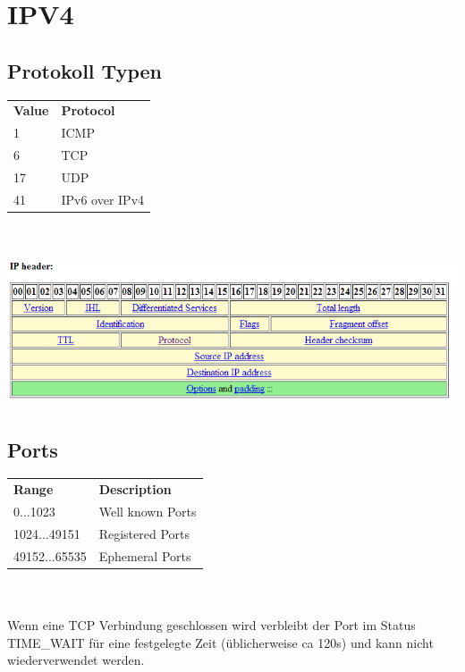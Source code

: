 \section{IPV4}
\subsection{Protokoll Typen}
\begin{tabular}[h]{ll}
  \textbf{Value} & \textbf{Protocol} \\
  1 & ICMP \\
  6 & TCP\\
  17 & UDP\\
  41 & IPv6 over IPv4
 \end{tabular}
 \\
 \\
\includegraphics[scale=0.8]{media/IPHeader.png}
\subsection{Ports}
\begin{tabular}[h]{ll}
  \textbf{Range} & \textbf{Description} \\
  0...1023 & Well known Ports \\
  1024...49151 & Registered Ports\\
  49152...65535 & Ephemeral Ports\\
 \end{tabular}
\\
\\ 

Wenn eine TCP Verbindung geschlossen wird verbleibt der Port im Status TIME\_WAIT für eine festgelegte Zeit (üblicherweise ca 120s) und kann nicht wiederverwendet werden.

